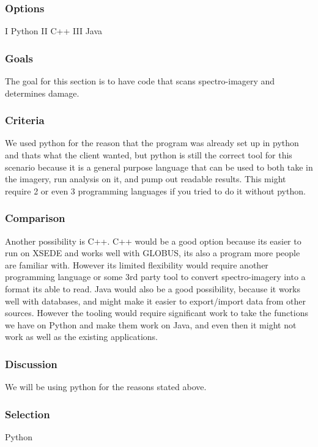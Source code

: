 \documentclass[10pt,draftclsnofoot,onecolumn,journal,compsoc]{IEEEtran}
\begin{document}
\subsubsection{Options}
\noindent I Python \newline
\noindent II C++ \newline
\noindent III Java

\subsubsection{Goals}
\noindent The goal for this section is to have code that scans spectro-imagery and determines damage.

\subsubsection{Criteria}
\noindent We used python
for the reason that the program was already set up in python and thats what the client wanted, but python is
still the correct tool for this scenario because it is a general purpose language that can be used to both take in
the imagery, run analysis on it, and pump out readable results. This might require 2 or even 3 programming
languages if you tried to do it without python.

\subsubsection{Comparison}
\noindent Another possibility is C++. C++ would be a good option because its easier to run on XSEDE and works well
with GLOBUS, its also a program more people are familiar with. However its limited flexibility would require
another programming language or some 3rd party tool to convert spectro-imagery into a format its able to read.\cite{5}
Java would also be a good possibility, because it works well with databases, and might make it easier to
export/import data from other sources. However the tooling would require significant work to take the functions
we have on Python and make them work on Java, and even then it might not work as well as the existing
applications.

\subsubsection{Discussion}
\noindent We will be using python for the reasons stated above.

\subsubsection{Selection}
\noindent Python
\end{document}
